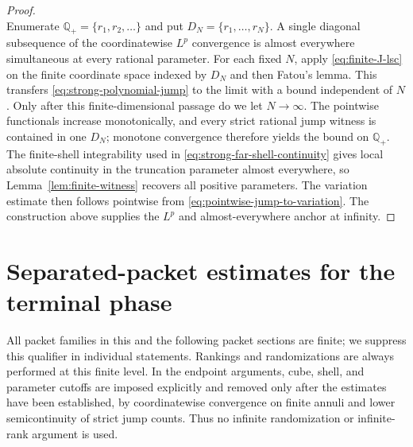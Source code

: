 \documentclass[11pt]{article}
\numberwithin{equation}{section}
\theoremstyle{remark}
\theoremstyle{definition}
\begin{document}
\begin{proof}
\[\]
Enumerate $\mathbb Q_+=\{r_1,r_2,\ldots\}$ and put
$D_N=\{r_1,\ldots,r_N\}$.  A single diagonal subsequence of the
coordinatewise $L^p$ convergence is almost everywhere simultaneous at
every rational parameter.  For each fixed $N$, apply
\eqref{eq:finite-J-lsc} on the finite coordinate space indexed by $D_N$
and then Fatou's lemma.  This transfers
\eqref{eq:strong-polynomial-jump} to the limit with a bound independent of
$N$.  Only after this finite-dimensional passage do we let $N\to\infty$.
The pointwise functionals increase monotonically, and every strict rational
jump witness is contained in one $D_N$; monotone convergence therefore
yields the bound on $\mathbb Q_+$.
The finite-shell integrability used in
\eqref{eq:strong-far-shell-continuity} gives local absolute continuity in
the truncation parameter almost everywhere, so
Lemma~\ref{lem:finite-witness} recovers all positive parameters.
The variation estimate then follows pointwise from
\eqref{eq:pointwise-jump-to-variation}.  The construction above supplies
the $L^p$ and almost-everywhere anchor at infinity.
\end{proof}
\medskip

\section{Separated-packet estimates for the terminal phase}
\label{sec:terminal-packets}

All packet families in this and the following packet sections are finite;
we suppress this qualifier in individual statements.  Rankings and
randomizations are always performed at this finite level.  In the endpoint
arguments, cube, shell, and parameter cutoffs are imposed explicitly and
removed only after the estimates have been established, by coordinatewise
convergence on finite annuli and lower semicontinuity of strict jump counts.
Thus no infinite randomization or infinite-rank argument is used.
\end{document}
